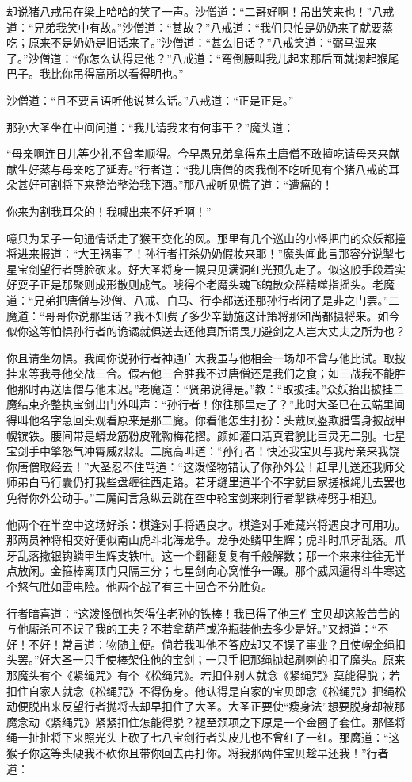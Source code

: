\documentclass[12pt,UTF8]{ctexbook}
\begin{document}
却说猪八戒吊在梁上哈哈的笑了一声。沙僧道：“二哥好啊！吊出笑来也！”八戒道：“兄弟我笑中有故。”沙僧道：“甚故？”八戒道：“我们只怕是奶奶来了就要蒸吃；原来不是奶奶是旧话来了。”沙僧道：“甚么旧话？”八戒笑道：“弼马温来了。”沙僧道：“你怎么认得是他？”八戒道：“弯倒腰叫我儿起来那后面就掬起猴尾巴子。我比你吊得高所以看得明也。”

沙僧道：“且不要言语听他说甚么话。”八戒道：“正是正是。”

那孙大圣坐在中间问道：“我儿请我来有何事干？”魔头道：

“母亲啊连日儿等少礼不曾孝顺得。今早愚兄弟拿得东土唐僧不敢擅吃请母亲来献献生好蒸与母亲吃了延寿。”行者道：“我儿唐僧的肉我倒不吃听见有个猪八戒的耳朵甚好可割将下来整治整治我下酒。”那八戒听见慌了道：“遭瘟的！

你来为割我耳朵的！我喊出来不好听啊！”

噫只为呆子一句通情话走了猴王变化的风。那里有几个巡山的小怪把门的众妖都撞将进来报道：“大王祸事了！孙行者打杀奶奶假妆来耶！”魔头闻此言那容分说掣七星宝剑望行者劈脸砍来。好大圣将身一幌只见满洞红光预先走了。似这般手段着实好耍子正是那聚则成形散则成气。唬得个老魔头魂飞魄散众群精噬指摇头。老魔道：“兄弟把唐僧与沙僧、八戒、白马、行李都送还那孙行者闭了是非之门罢。”二魔道：“哥哥你说那里话？我不知费了多少辛勤施这计策将那和尚都摄将来。如今似你这等怕惧孙行者的诡谲就俱送去还他真所谓畏刀避剑之人岂大丈夫之所为也？

你且请坐勿惧。我闻你说孙行者神通广大我虽与他相会一场却不曾与他比试。取披挂来等我寻他交战三合。假若他三合胜我不过唐僧还是我们之食；如三战我不能胜他那时再送唐僧与他未迟。”老魔道：“贤弟说得是。”教：“取披挂。”众妖抬出披挂二魔结束齐整执宝剑出门外叫声：“孙行者！你往那里走了？”此时大圣已在云端里闻得叫他名字急回头观看原来是那二魔。你看他怎生打扮：头戴凤盔欺腊雪身披战甲幌镔铁。腰间带是蟒龙筋粉皮靴靿梅花摺。颜如灌口活真君貌比巨灵无二别。七星宝剑手中擎怒气冲霄威烈烈。二魔高叫道：“孙行者！快还我宝贝与我母亲来我饶你唐僧取经去！”大圣忍不住骂道：“这泼怪物错认了你孙外公！赶早儿送还我师父师弟白马行囊仍打我些盘缠往西走路。若牙缝里道半个不字就自家搓根绳儿去罢也免得你外公动手。”二魔闻言急纵云跳在空中轮宝剑来刺行者掣铁棒劈手相迎。

他两个在半空中这场好杀：棋逢对手将遇良才。棋逢对手难藏兴将遇良才可用功。那两员神将相交好便似南山虎斗北海龙争。龙争处鳞甲生辉；虎斗时爪牙乱落。爪牙乱落撒银钩鳞甲生辉支铁叶。这一个翻翻复复有千般解数；那一个来来往往无半点放闲。金箍棒离顶门只隔三分；七星剑向心窝惟争一蹍。那个威风逼得斗牛寒这个怒气胜如雷电险。他两个战了有三十回合不分胜负。

行者暗喜道：“这泼怪倒也架得住老孙的铁棒！我已得了他三件宝贝却这般苦苦的与他厮杀可不误了我的工夫？不若拿葫芦或净瓶装他去多少是好。”又想道：“不好！不好！常言道：物随主便。倘若我叫他不答应却又不误了事业？且使幌金绳扣头罢。”好大圣一只手使棒架住他的宝剑；一只手把那绳抛起刷喇的扣了魔头。原来那魔头有个《紧绳咒》有个《松绳咒》。若扣住别人就念《紧绳咒》莫能得脱；若扣住自家人就念《松绳咒》不得伤身。他认得是自家的宝贝即念《松绳咒》把绳松动便脱出来反望行者抛将去却早扣住了大圣。大圣正要使“瘦身法”想要脱身却被那魔念动《紧绳咒》紧紧扣住怎能得脱？褪至颈项之下原是一个金圈子套住。那怪将绳一扯扯将下来照光头上砍了七八宝剑行者头皮儿也不曾红了一红。那魔道：“这猴子你这等头硬我不砍你且带你回去再打你。将我那两件宝贝趁早还我！”行者道：
\end{document}
